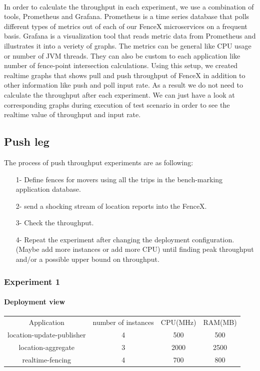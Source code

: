 \documentclass[a4]{report}
\begin{document}
    \paragraph{}
    In order to calculate the throughput in each experiment, we use a combination of tools, Prometheus and Grafana.
    Prometheus is a time series database that polls different types of metrics out of each of our FenceX
    microservices on a frequent basis.
    Grafana is a visualization tool that reads metric data from Prometheus and illustrates it into a veriety of graphs.
    The metrics can be general like CPU usage or number of JVM threads.
    They can also be custom to each application like number of fence-point intersection calculations.
    Using this setup, we created realtime graphs that shows pull and push throughput of FenceX in addition to other
    information like push and poll input rate.
    As a result we do not need to calculate the throughput after each experiment.
    We can just have a look at corresponding graphs during execution of test scenario in order to see the realtime
    value of throughput and input rate.

    \subsection{Push leg}
    The process of push throughput experiments are as following:
    \begin{itemize}
        \item[1-] Define fences for movers using all the trips in the bench-marking application database.
        \item[2-] send a shocking stream of location reports into the FenceX.
        \item[3-] Check the throughput.
        \item[4-] Repeat the experiment after changing the deployment configuration. (Maybe add more instances or add
        more CPU) until finding peak throughput and/or a possible upper bound on throughput.
    \end{itemize}

    \subsubsection{Experiment 1}

    \paragraph{Deployment view}
    \begin{center}
        \begin{tabular}{ c c c c }
            Application               & number of instances & CPU(MHz) & RAM(MB) \\
            location-update-publisher & 4                   & 500      & 500     \\
            location-aggregate        & 3                   & 2000     & 2500    \\
            realtime-fencing          & 4                   & 700      & 800     \\
        \end{tabular}
    \end{center}
\end{document}
